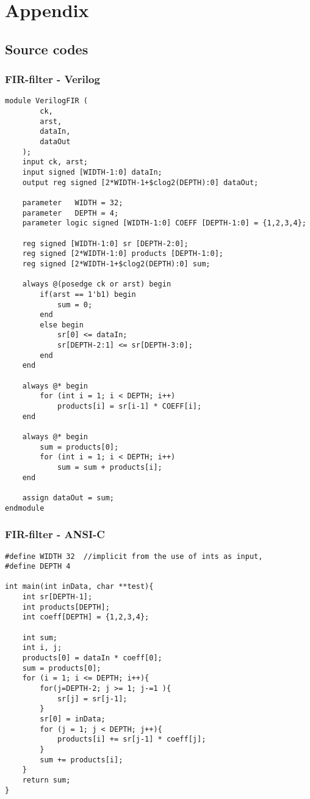 \chapter{Appendix}
\section{\label{sec:sourcecode}Source codes}

\subsection{FIR-filter - Verilog}
\lstset{language=Verilog, style=Verilogstyle}
\begin{lstlisting}[caption={FIR-filter implemented in Verilog},label=lst:firfilterverilog]
module VerilogFIR (
		ck,
		arst,
		dataIn,
		dataOut
	);
	input ck, arst;
	input signed [WIDTH-1:0] dataIn;
	output reg signed [2*WIDTH-1+$clog2(DEPTH):0] dataOut;
	
	parameter	WIDTH = 32;
	parameter	DEPTH = 4;
	parameter logic signed [WIDTH-1:0] COEFF [DEPTH-1:0] = {1,2,3,4};
	
	reg signed [WIDTH-1:0] sr [DEPTH-2:0];
	reg signed [2*WIDTH-1:0] products [DEPTH-1:0];
	reg signed [2*WIDTH-1+$clog2(DEPTH):0] sum;
	
	always @(posedge ck or arst) begin
		if(arst == 1'b1) begin
			sum = 0;
		end 
		else begin
			sr[0] <= dataIn;
			sr[DEPTH-2:1] <= sr[DEPTH-3:0];
		end
	end
	
	always @* begin
		for (int i = 1; i < DEPTH; i++)
			products[i] = sr[i-1] * COEFF[i];
	end
	
	always @* begin
		sum = products[0];
		for (int i = 1; i < DEPTH; i++)
			sum = sum + products[i];
	end
	
	assign dataOut = sum;
endmodule
\end{lstlisting}
\clearpage
\subsection{FIR-filter - ANSI-C}
\lstset{language=C,style=Cstyle}
\begin{lstlisting}[caption={FIR-filter implemented in C},label=lst:firfilterc]
#define WIDTH 32  //implicit from the use of ints as input,
#define DEPTH 4

int main(int inData, char **test){
    int sr[DEPTH-1];
	int products[DEPTH];
    int coeff[DEPTH] = {1,2,3,4};

    int sum;
	int i, j;
	products[0] = dataIn * coeff[0];
	sum = products[0];
    for (i = 1; i <= DEPTH; i++){
		for(j=DEPTH-2; j >= 1; j-=1 ){
			sr[j] = sr[j-1];
		}
		sr[0] = inData;
		for (j = 1; j < DEPTH; j++){
			products[i] += sr[j-1] * coeff[j];
		}
        sum += products[i];
    }
    return sum;
}
\end{lstlisting}
\clearpage
